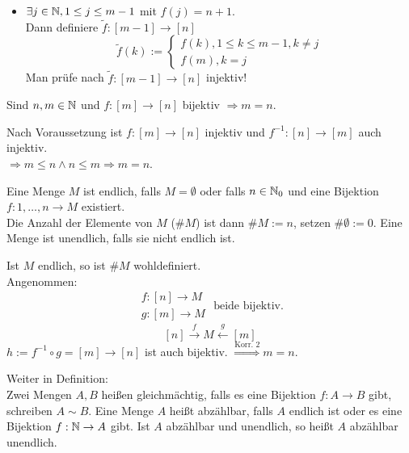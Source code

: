 \documentclass[../ana1.tex]{subfiles}
\begin{document}
\begin{bew}
\begin{itemize}
			  (k) := f(k), 1\leq k\leq m-1\) \\
		      (Nachrechnen \(\tilde{f}\) ist injektiv.)
		\item \(\exists j\in\mathbb{N}, 1\leq j\leq m-1\) mit \(f(j) = n+1\).\\
		      Dann definiere \(\tilde{f}: [m-1]\rightarrow [n]\)
		      \[\tilde{f}(k) :=
			      	\begin{cases}
				    	f(k), 1 \leq k \leq m-1, k\neq j \\
				      	f(m), k=j
			      	\end{cases}\]
		      Man prüfe nach \(\tilde{f}: [m-1]\rightarrow [n]\) injektiv!
	\end{itemize}
\end{bew}

\begin{kor}
	Sind \(n,m\in\mathbb{N} \) und \(f:[m]\rightarrow[n]\) bijektiv \(\Rightarrow m=n\).
\end{kor}
\begin{bew}
	Nach Voraussetzung ist \(f: [m]\rightarrow[n]\) injektiv und \(f^{-1}:[n]\rightarrow[m]\) auch injektiv.\\
	\(\Rightarrow m\leq n \wedge n \leq m \Rightarrow m = n\).
\end{bew}

\begin{defi}
	Eine Menge \(M\) ist endlich, falls \( M=\emptyset \) oder falls \( n\in\mathbb{N}_0 \) und eine Bijektion \( f:{1,\ldots,n}\rightarrow M \) existiert.\\
	Die Anzahl der Elemente von \(M\) (\( \#M \)) ist dann \( \#M:=n \), setzen \( \#\emptyset := 0 \). Eine Menge ist unendlich, falls sie nicht endlich ist.
	
	\begin{bem}
		Ist \(M\) endlich, so ist \( \#M\) wohldefiniert. \\
		Angenommen:
		\[ \begin{array}{lr}
				f:[n]\rightarrow M \\
				g:[m]\rightarrow M
			\end{array}
			\text{ beide bijektiv.}\]
		\[ [n]\overset{f}{\longrightarrow} M \overset{g}{\longleftarrow} [m] \]
		\( h:= f^{-1}\circ g = [m]\rightarrow[n]\) ist auch bijektiv. \(\overset{\text{Korr. 2}}{\Rightarrow} m=n\).
	\end{bem}

	Weiter in Definition:\\
	Zwei Mengen \(A,B\) heißen gleichmächtig, falls es eine Bijektion \(f: A\rightarrow B\) gibt, schreiben \(A\sim B\). Eine Menge \(A\) heißt abzählbar, falls \(A\) endlich ist oder es eine Bijektion \(f: \mathbb{N}\rightarrow A\) gibt. Ist \(A\) abzählbar und unendlich, so heißt \(A\) abzählbar unendlich.
\end{defi}
\end{document}
